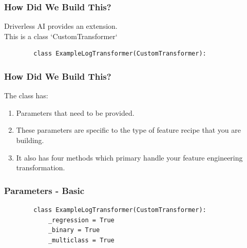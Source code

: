 \documentclass[11pt,
               aspectratio=169,
               hyperref={colorlinks}
               ]{beamer}
\begin{document}
	\begin{frame}[fragile]
		\frametitle{How Did We Build This?}
		Driverless AI provides an extension. \\
		This is a class `CustomTransformer`
		\begin{verbatim}
		class ExampleLogTransformer(CustomTransformer):
		\end{verbatim}
\end{frame}
	\begin{frame}[fragile]
		\frametitle{How Did We Build This?}
		The class has:
		\begin{enumerate}
			\item Parameters that need to be provided. 
			\item These parameters are specific to the type of feature recipe that you are building. 
			\item It also has four methods which primary handle your feature engineering transformation. 
		\end{enumerate}
			
\end{frame}
	\begin{frame}[fragile]
		\frametitle{Parameters - Basic}
		\begin{verbatim}
		class ExampleLogTransformer(CustomTransformer):
			_regression = True
			_binary = True
			_multiclass = True
		\end{verbatim}
			
\end{frame}
\end{document}
